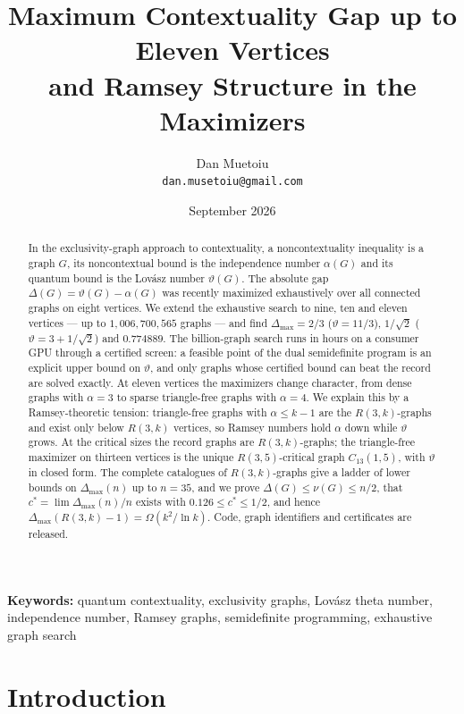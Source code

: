 \documentclass[11pt]{article}
\title{Maximum Contextuality Gap up to Eleven Vertices\\and Ramsey Structure in the Maximizers}
\author{Dan Mu\textcommabelow{s}etoiu\\
\texttt{dan.musetoiu@gmail.com}} %
\date{September 2026}
\renewcommand{\theta}{\vartheta}
\newcommand{\gap}{\Delta}
\begin{document}
\maketitle

\begin{abstract}
In the exclusivity-graph approach to contextuality, a noncontextuality inequality is a graph $G$, its noncontextual bound is the independence number $\alpha(G)$ and its quantum bound is the Lov\'asz number $\theta(G)$. The absolute gap $\gap(G)=\theta(G)-\alpha(G)$ was recently maximized exhaustively over all connected graphs on eight vertices. We extend the exhaustive search to nine, ten and eleven vertices --- up to $1{,}006{,}700{,}565$ graphs --- and find $\gap_{\max}=2/3$ ($\theta=11/3$), $1/\sqrt2$ ($\theta=3+1/\sqrt2$) and $0.774889$. The billion-graph search runs in hours on a consumer GPU through a certified screen: a feasible point of the dual semidefinite program is an explicit upper bound on $\theta$, and only graphs whose certified bound can beat the record are solved exactly. At eleven vertices the maximizers change character, from dense graphs with $\alpha=3$ to sparse triangle-free graphs with $\alpha=4$. We explain this by a Ramsey-theoretic tension: triangle-free graphs with $\alpha\le k-1$ are the $R(3,k)$-graphs and exist only below $R(3,k)$ vertices, so Ramsey numbers hold $\alpha$ down while $\theta$ grows. At the critical sizes the record graphs are $R(3,k)$-graphs; the triangle-free maximizer on thirteen vertices is the unique $R(3,5)$-critical graph $C_{13}(1,5)$, with $\theta$ in closed form. The complete catalogues of $R(3,k)$-graphs give a ladder of lower bounds on $\gap_{\max}(n)$ up to $n=35$, and we prove $\gap(G)\le\nu(G)\le n/2$, that $c^*=\lim\gap_{\max}(n)/n$ exists with $0.126\le c^*\le1/2$, and hence $\gap_{\max}(R(3,k)-1)=\Omega(k^2/\ln k)$. Code, graph identifiers and certificates are released.
\end{abstract}

\noindent\textbf{Keywords:} quantum contextuality, exclusivity graphs, Lov\'asz theta number, independence number, Ramsey graphs, semidefinite programming, exhaustive graph search

\section{Introduction}
\end{document}
